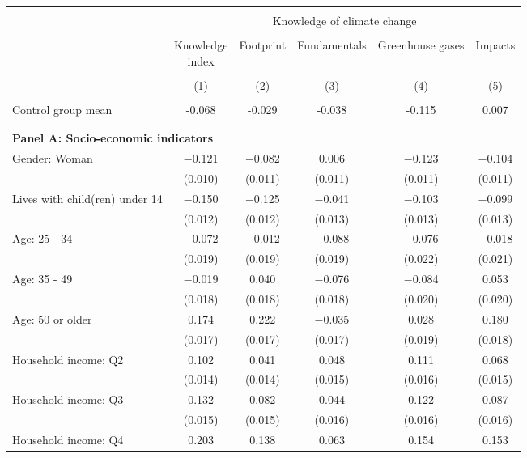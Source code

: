 
\begin{tabular}{@{\extracolsep{5pt}}lccccc} 
\\[-1.8ex]\hline 
\hline \\[-1.8ex] 
 & \multicolumn{5}{c}{Knowledge of climate change} \\ 
\cline{2-6} 
\\[-1.8ex] & \makecell{Knowledge\\index} & Footprint & Fundamentals & Greenhouse gases & Impacts \\ 
\\[-1.8ex] & (1) & (2) & (3) & (4) & (5)\\ 
\hline \\[-1.8ex] 
Control group mean & -0.068 & -0.029 & -0.038 & -0.115 & 0.007  \\ \hline \\[-1.8ex]
\\[1ex]
\multicolumn{ 6 }{l}{\textbf{ Panel A: Socio-economic indicators }} \\
 Gender: Woman & $-$0.121 & $-$0.082 & 0.006 & $-$0.123 & $-$0.104 \\ 
  & (0.010) & (0.011) & (0.011) & (0.011) & (0.011) \\ 
  Lives with child(ren) under 14 & $-$0.150 & $-$0.125 & $-$0.041 & $-$0.103 & $-$0.099 \\ 
  & (0.012) & (0.012) & (0.013) & (0.013) & (0.013) \\ 
  Age: 25 - 34 & $-$0.072 & $-$0.012 & $-$0.088 & $-$0.076 & $-$0.018 \\ 
  & (0.019) & (0.019) & (0.019) & (0.022) & (0.021) \\ 
  Age: 35 - 49 & $-$0.019 & 0.040 & $-$0.076 & $-$0.084 & 0.053 \\ 
  & (0.018) & (0.018) & (0.018) & (0.020) & (0.020) \\ 
  Age: 50 or older & 0.174 & 0.222 & $-$0.035 & 0.028 & 0.180 \\ 
  & (0.017) & (0.017) & (0.017) & (0.019) & (0.018) \\ 
  Household income: Q2 & 0.102 & 0.041 & 0.048 & 0.111 & 0.068 \\ 
  & (0.014) & (0.014) & (0.015) & (0.016) & (0.015) \\ 
  Household income: Q3 & 0.132 & 0.082 & 0.044 & 0.122 & 0.087 \\ 
  & (0.015) & (0.015) & (0.016) & (0.016) & (0.016) \\ 
  Household income: Q4 & 0.203 & 0.138 & 0.063 & 0.154 & 0.153 \\ 

\end{tabular}
